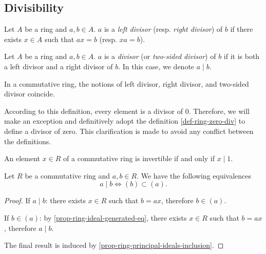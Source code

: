 \documentclass[12pt]{report}
\begin{document}
\subsection{Divisibility}

\begin{definition} \label{def-ring-lr-divisibility}
    Let $A$ be a ring and $a, b \in A$. $a$ is a \emph{left divisor} (resp. \emph{right divisor}) of $b$ if there exists $x \in A$ such that $ax = b$ (resp. $xa = b$).
\end{definition}

\begin{definition} \label{def-ring-divisibility}
    Let $A$ be a ring and $a, b \in A$. $a$ is a \emph{divisor} (or \emph{two-sided divisor}) of $b$ if it is both a left divisor and a right divisor of $b$. In this case, we denote $a \mid b$.
\end{definition}

\begin{remark}
    In a commutative ring, the notions of left divisor, right divisor, and two-sided divisor coincide.
\end{remark}

\begin{remark}
    According to this definition, every element is a divisor of $0$. Therefore, we will make an exception and definitively adopt the definition \ref{def-ring-zero-div} to define a divisor of zero. This clarification is made to avoid any conflict between the definitions.
\end{remark}

\begin{remark}
    An element $x \in R$ of a commutative ring is invertible if and only if $x \mid 1$.
\end{remark}

\begin{proposition} \label{prop-ring-divisibility-eq}
    Let $R$ be a commutative ring and $a, b \in R$. We have the following equivalences
    \[
        a \mid b \iff (b) \subset (a).
    \]
\end{proposition}

\begin{proof}
    If $a \mid b$: there exists $x \in R$ such that $b = ax$, therefore $b \in (a)$.

    If $b \in (a)$: by \ref{prop-ring-ideal-generated-eq}, there exists $x \in R$ such that $b = ax$, therefore $a \mid b$.

    The final result is induced by  \ref{prop-ring-principal-ideals-inclusion}.
\end{proof}
\end{document}
